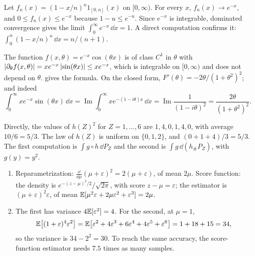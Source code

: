 Let $f_n(x) = (1 - x/n)^n1_{[0, n]}(x)$ on $[0, \infty)$. For every $x$,
$f_n(x)\to e^{-x}$, and $0\leq f_n(x)\leq e^{-x}$ because
$1 - u\leq e^{-u}$. Since $e^{-x}$ is integrable, dominated convergence
gives the limit $\int_0^\infty e^{-x}\,\dd x = 1$. A direct computation
confirms it: $\int_0^n(1 - x/n)^n\,\dd x = n/(n + 1)$.

The function $f(x, \theta) = e^{-x}\cos(\theta x)$ is of class $C^1$ in
$\theta$ with
$\left|\partial_\theta f(x, \theta)\right| = xe^{-x}\left|\sin(\theta x)\right|
\leq xe^{-x}$, which is integrable on $[0, \infty)$ and does not depend
on $\theta$.  gives the formula. On the
closed form, $F'(\theta) = -2\theta/(1 + \theta^2)^2$; and indeed
\[
  \int_0^\infty xe^{-x}\sin(\theta x)\,\dd x
  = \operatorname{Im}\int_0^\infty xe^{-(1 - i\theta)x}\,\dd x
  = \operatorname{Im}\frac1{(1 - i\theta)^2}
  = \frac{2\theta}{(1 + \theta^2)^2} .
\]

Directly, the values of $h(Z)^2$ for $Z = 1,\dots,6$ are
$1, 4, 0, 1, 4, 0$, with average $10/6 = 5/3$. The law of $h(Z)$ is
uniform on $\{0, 1, 2\}$, and $(0 + 1 + 4)/3 = 5/3$. The first
computation is $\int g\circ h\,\dd P_Z$ and the second is
$\int g\,\dd(h_\#P_Z)$, with $g(y) = y^2$.

\begin{enumerate}[nosep]
  \item Reparametrization: $\frac{\dd}{\dd\mu}(\mu + \varepsilon)^2
        = 2(\mu + \varepsilon)$, of mean $2\mu$. Score function: the
        density is $e^{-(z - \mu)^2/2}/\sqrt{2\pi}$, with score
        $z - \mu = \varepsilon$; the estimator is
        $(\mu + \varepsilon)^2\varepsilon$, of mean
        $\mathbb{E}[\mu^2\varepsilon + 2\mu\varepsilon^2 + \varepsilon^3]
        = 2\mu$.
  \item The first has variance $4\mathbb{E}[\varepsilon^2] = 4$. For the
        second, at $\mu = 1$,
        \[
          \mathbb{E}\bigl[(1 + \varepsilon)^4\varepsilon^2\bigr]
          = \mathbb{E}\bigl[\varepsilon^2 + 4\varepsilon^3 + 6\varepsilon^4
            + 4\varepsilon^5 + \varepsilon^6\bigr]
          = 1 + 18 + 15 = 34 ,
        \]
        so the variance is $34 - 2^2 = 30$. To reach the same accuracy,
        the score-function estimator needs $7.5$ times as many samples.
\end{enumerate}

